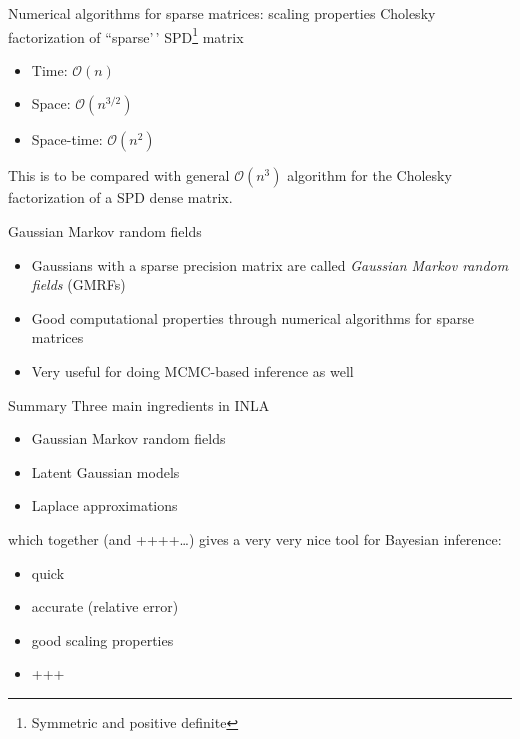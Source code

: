 \documentclass[
  ignorenonframetext,
]{beamer}
\providecommand{\tightlist}{%
  \setlength{\itemsep}{0pt}\setlength{\parskip}{0pt}}
\begin{document}
\begin{frame}{Numerical algorithms for sparse matrices: scaling
properties}
\protect\hypertarget{numerical-algorithms-for-sparse-matrices-scaling-properties}{}
Cholesky factorization of ``sparse'\,'
SPD\footnote{Symmetric and positive definite} matrix

\begin{itemize}
\tightlist
\item
  Time: \({\mathcal O}(n)\)
\item
  Space: \({\mathcal O}(n^{3/2})\)
\item
  Space-time: \({\mathcal O}(n^2)\)
\end{itemize}

\pause

This is to be compared with general \({\mathcal O}(n^{3})\) algorithm
for the Cholesky factorization of a SPD dense matrix.
\end{frame}

\begin{frame}{Gaussian Markov random fields}
\protect\hypertarget{gaussian-markov-random-fields}{}
\begin{itemize}
\item
  Gaussians with a sparse precision matrix are called
  \emph{Gaussian Markov random fields} (GMRFs)
\item
  Good computational properties through numerical algorithms for sparse
  matrices
\item
  Very useful for doing MCMC-based inference as well
\end{itemize}
\end{frame}

\begin{frame}{Summary}
\protect\hypertarget{summary}{}
Three main ingredients in INLA

\begin{itemize}
\item
  Gaussian Markov random fields
\item
  Latent Gaussian models
\item
  Laplace approximations

  \pause
\end{itemize}

which together (and ++++\ldots) gives a very very nice tool for Bayesian
inference:

\begin{itemize}
\tightlist
\item
  quick
\item
  accurate (relative error)
\item
  good scaling properties
\item
  +++
\end{itemize}
\end{frame}
\end{document}
